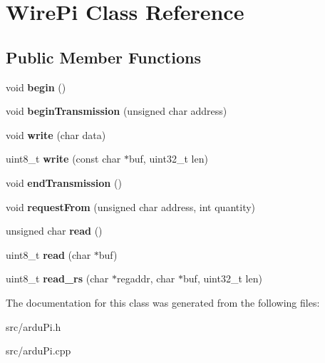 \hypertarget{class_wire_pi}{}\section{Wire\+Pi Class Reference}
\label{class_wire_pi}
\subsection*{Public Member Functions}
\begin{DoxyCompactItemize}
\item 
\hypertarget{class_wire_pi_a561931953fccb4a93f5be06079a54e7b}{}void {\bfseries begin} ()\label{class_wire_pi_a561931953fccb4a93f5be06079a54e7b}

\item 
\hypertarget{class_wire_pi_a592d82d0e54ecc894ec5963f01487124}{}void {\bfseries begin\+Transmission} (unsigned char address)\label{class_wire_pi_a592d82d0e54ecc894ec5963f01487124}

\item 
\hypertarget{class_wire_pi_a218b0091d86e12e5876f820df5a8b683}{}void {\bfseries write} (char data)\label{class_wire_pi_a218b0091d86e12e5876f820df5a8b683}

\item 
\hypertarget{class_wire_pi_a32395dfd402421119d527d8725e025fe}{}uint8\+\_\+t {\bfseries write} (const char $\ast$buf, uint32\+\_\+t len)\label{class_wire_pi_a32395dfd402421119d527d8725e025fe}

\item 
\hypertarget{class_wire_pi_ae6d2f4b42fc5d893cda7559b8f53ca19}{}void {\bfseries end\+Transmission} ()\label{class_wire_pi_ae6d2f4b42fc5d893cda7559b8f53ca19}

\item 
\hypertarget{class_wire_pi_ac9a5b009f34a09ad2e3942256ccd4178}{}void {\bfseries request\+From} (unsigned char address, int quantity)\label{class_wire_pi_ac9a5b009f34a09ad2e3942256ccd4178}

\item 
\hypertarget{class_wire_pi_ad816efa9fa5b1ea4ef33deed21756aca}{}unsigned char {\bfseries read} ()\label{class_wire_pi_ad816efa9fa5b1ea4ef33deed21756aca}

\item 
\hypertarget{class_wire_pi_ab3054c93be2a26b613e0208b327e3eea}{}uint8\+\_\+t {\bfseries read} (char $\ast$buf)\label{class_wire_pi_ab3054c93be2a26b613e0208b327e3eea}

\item 
\hypertarget{class_wire_pi_aab78e3ff6ea6d5c65e8fabad6a2d2825}{}uint8\+\_\+t {\bfseries read\+\_\+rs} (char $\ast$regaddr, char $\ast$buf, uint32\+\_\+t len)\label{class_wire_pi_aab78e3ff6ea6d5c65e8fabad6a2d2825}

\end{DoxyCompactItemize}


The documentation for this class was generated from the following files\+:\begin{DoxyCompactItemize}
\item 
src/ardu\+Pi.\+h\item 
src/ardu\+Pi.\+cpp\end{DoxyCompactItemize}
